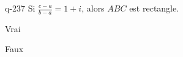 \begin{truefalse}{q-237}
Si $\frac{c-a}{b-a} =1+i$, alors $ABC$ est rectangle.
\item* Vrai
\item Faux
\end{truefalse}

